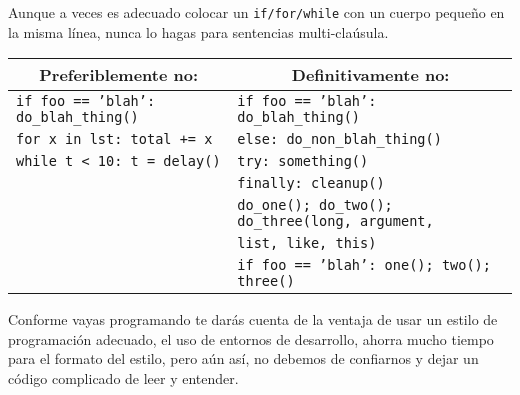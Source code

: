 Aunque a veces es adecuado colocar un \texttt{if/for/while} con un cuerpo pequeño en la misma línea, nunca lo hagas para sentencias multi-claúsula.
\begin{center}
\begin{tabular}{| l | l |}
\hline
\multicolumn{1}{|c|}{\textbf{Preferiblemente no:}} & \multicolumn{1}{c|}{\textbf{Definitivamente no:}} \\ \hline
\texttt{if foo == 'blah': do\_blah\_thing()} & \texttt{if foo == 'blah': do\_blah\_thing()} \\
\texttt{for x in lst: total += x} & \texttt{else: do\_non\_blah\_thing()} \\
\texttt{while t < 10: t = delay()} & \texttt{try: something()} \\
 & \texttt{finally: cleanup()}\\
 & \texttt{do\_one(); do\_two(); do\_three(long, argument,} \\
 & \texttt{\quad \quad \quad \quad \quad \quad list, like, this)} \\
 & \texttt{if foo == 'blah': one(); two(); three()} \\ \hline
\end{tabular}
\end{center}
Conforme vayas programando te darás cuenta de la ventaja de usar un estilo de programación adecuado, el uso de entornos de desarrollo, ahorra mucho tiempo para el formato del estilo, pero aún así, no debemos de confiarnos y dejar un código complicado de leer y entender.
